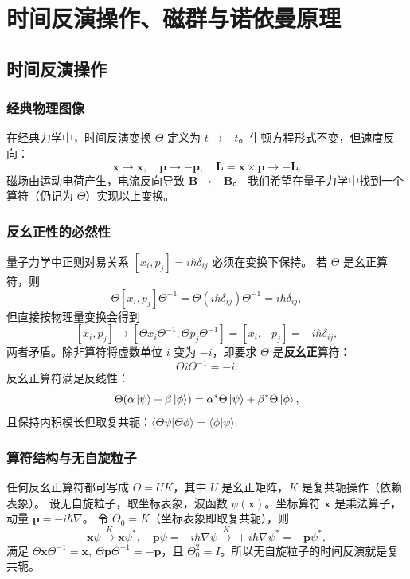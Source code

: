 
\chapter{时间反演操作、磁群与诺依曼原理}
\label{T,MG}
\section{时间反演操作}

\subsection{经典物理图像}
在经典力学中，时间反演变换 $\Theta$ 定义为 $t \to -t$。牛顿方程形式不变，但速度反向：
\[
\mathbf{x} \to \mathbf{x},\quad \mathbf{p} \to -\mathbf{p},\quad \mathbf{L}=\mathbf{x}\times\mathbf{p} \to -\mathbf{L}.
\]
磁场由运动电荷产生，电流反向导致 $\mathbf{B} \to -\mathbf{B}$。  
我们希望在量子力学中找到一个算符（仍记为 $\Theta$）实现以上变换。

\subsection{反幺正性的必然性}
量子力学中正则对易关系 $[x_i,p_j]=i\hbar\delta_{ij}$ 必须在变换下保持。
若 $\Theta$ 是幺正算符，则
\[
\Theta[x_i,p_j]\Theta^{-1} = \Theta(i\hbar\delta_{ij})\Theta^{-1}=i\hbar\delta_{ij},
\]
但直接按物理量变换会得到
\[
[x_i,p_j] \to [\Theta x_i\Theta^{-1},\Theta p_j\Theta^{-1}] = [x_i,-p_j] = -i\hbar\delta_{ij},
\]
两者矛盾。除非算符将虚数单位 $i$ 变为 $-i$，即要求 $\Theta$ 是\textbf{反幺正}算符：
\[
\Theta i \Theta^{-1} = -i.
\]
反幺正算符满足反线性：
\[
\Theta(\alpha\ket{\psi}+\beta\ket{\phi}) = \alpha^* \Theta\ket{\psi} + \beta^* \Theta\ket{\phi},
\]
且保持内积模长但取复共轭：$\langle \Theta\psi|\Theta\phi\rangle = \langle\phi|\psi\rangle$.

\subsection{算符结构与无自旋粒子}
任何反幺正算符都可写成 $\Theta = UK$，其中 $U$ 是幺正矩阵，$K$ 是复共轭操作（依赖表象）。
设无自旋粒子，取坐标表象，波函数 $\psi(\mathbf{x})$。坐标算符 $\mathbf{x}$ 是乘法算子，动量 $\mathbf{p} = -i\hbar\nabla$。
令 $\Theta_0 = K$（坐标表象即取复共轭），则
\[
\mathbf{x}\psi \xrightarrow{K} \mathbf{x}\psi^*,\quad \mathbf{p}\psi = -i\hbar\nabla\psi \xrightarrow{K} +i\hbar\nabla\psi^* = -\mathbf{p}\psi^*,
\]
满足 $\Theta\mathbf{x}\Theta^{-1}=\mathbf{x},\ \Theta\mathbf{p}\Theta^{-1}=-\mathbf{p}$，且 $\Theta_0^2=I$。所以无自旋粒子的时间反演就是复共轭。

